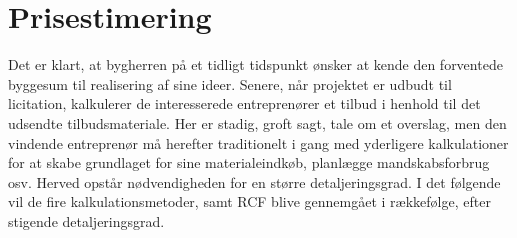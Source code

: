 \chapter{Prisestimering}

Det er klart, at bygherren på et tidligt tidspunkt ønsker at kende den forventede byggesum til realisering af sine ideer. Senere, når projektet er udbudt til licitation, kalkulerer de interesserede entreprenører et tilbud i henhold til det udsendte tilbudsmateriale. Her er stadig, groft sagt, tale om et overslag, men den vindende entreprenør må herefter traditionelt i gang med yderligere kalkulationer for at skabe grundlaget for sine materialeindkøb, planlægge mandskabsforbrug osv. Herved opstår nødvendigheden for en større detaljeringsgrad. I det følgende vil de fire kalkulationsmetoder, samt RCF blive gennemgået i rækkefølge, efter stigende detaljeringsgrad. \citep{bib:bec}

